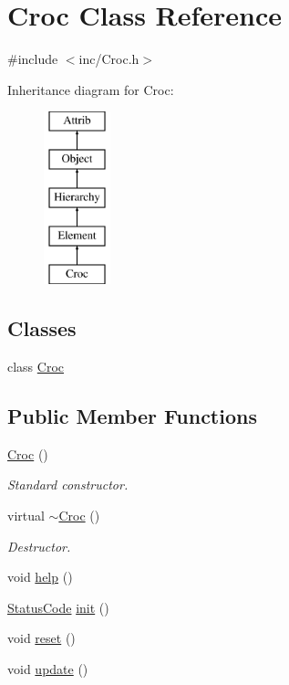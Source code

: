 \hypertarget{classCroc}{}\section{Croc Class Reference}
\label{classCroc}


{\ttfamily \#include $<$inc/\+Croc.\+h$>$}

Inheritance diagram for Croc\+:\begin{figure}[H]
\begin{center}
\leavevmode
\includegraphics[height=5.000000cm]{classCroc}
\end{center}
\end{figure}
\subsection*{Classes}
\begin{DoxyCompactItemize}
\item 
class \hyperlink{classCroc_1_1Croc}{Croc}
\end{DoxyCompactItemize}
\subsection*{Public Member Functions}
\begin{DoxyCompactItemize}
\item 
\hyperlink{classCroc_ac9997a70a0b5b197789f6e2ba80b498b}{Croc} ()
\begin{DoxyCompactList}\small\item\em Standard constructor. \end{DoxyCompactList}\item 
virtual \hyperlink{classCroc_ace1e761410c9b53c1ff062a0dadcbd7b}{$\sim$\+Croc} ()
\begin{DoxyCompactList}\small\item\em Destructor. \end{DoxyCompactList}\item 
void \hyperlink{classCroc_a21195cea3b5ba13f90397cc8faa52633}{help} ()
\item 
\hyperlink{classStatusCode}{Status\+Code} \hyperlink{classCroc_a0ccc2406507c081f637a4d0346494f09}{init} ()
\item 
void \hyperlink{classCroc_aa95453776f49e4affe375500e96eb906}{reset} ()
\item 
void \hyperlink{classCroc_a74b7f08ffdc15f8244af02c8cdccbc8f}{update} ()
\end{DoxyCompactItemize}
